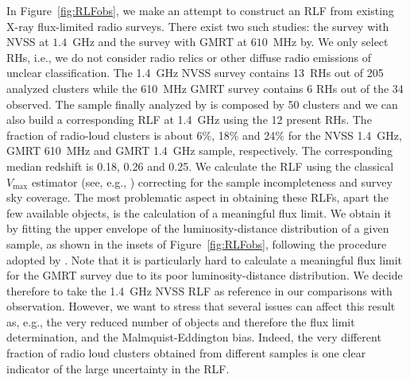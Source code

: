 \documentclass[traditabstract]{aa}
\newcommand{\rmn}{\mathrm}
\begin{document}
\begin{appendix}
In Figure~\ref{fig:RLFobs}, we make an attempt to construct an RLF from existing X-ray flux-limited radio surveys. There exist two such studies: the \cite{1999NewA....4..141G} survey with NVSS at $1.4$~GHz and the \cite{VenturiGMRT_1,VenturiGMRT_2} survey with GMRT at $610$~MHz by. We only select RHs, i.e., we do not consider radio relics or other diffuse radio emissions of unclear classification. The 1.4~GHz NVSS survey contains 13~RHs out of 205 analyzed clusters while the 610~MHz GMRT survey contains 6 RHs out of the 34 observed. The sample finally analyzed by \cite{VenturiGMRT_1,VenturiGMRT_2} is composed by 50 clusters and we can also build a corresponding RLF at 1.4~GHz using the 12 present RHs. The fraction of radio-loud clusters is about 6\%, 18\% and 24\% for the NVSS 1.4~GHz, GMRT 610~MHz and GMRT 1.4~GHz sample, respectively. The corresponding median redshift is 0.18, 0.26 and 0.25. We calculate the RLF using the classical $V_{\rmn{max}}$ estimator (see, e.g., \citealp{1976ApJ...207..700F}) correcting for the sample incompleteness and survey sky coverage. The most problematic aspect in obtaining these RLFs, apart the few available objects, is the calculation of a meaningful flux limit. We obtain it by fitting the upper envelope of the luminosity-distance distribution of a given sample, as shown in the insets of Figure~\ref{fig:RLFobs}, following the procedure adopted by \cite{2011arXiv1106.5494B}. Note that it is particularly hard to calculate a meaningful flux limit for the GMRT survey due to its poor luminosity-distance distribution. We decide therefore to take the 1.4~GHz NVSS RLF as reference in our comparisons with observation. However, we want to stress that several issues can affect this result as, e.g., the very reduced number of objects and therefore the flux limit determination, and the Malmquist-Eddington bias. Indeed, the very different fraction of radio loud clusters obtained from different samples is one clear indicator of the large uncertainty in the RLF.


\end{appendix}
\end{document}
